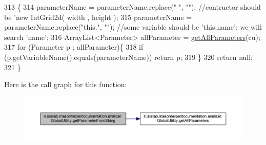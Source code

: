 \begin{DoxyCode}
313                                                                                             \{
314         parameterName = parameterName.replace(\textcolor{stringliteral}{" "}, \textcolor{stringliteral}{""}); \textcolor{comment}{//contructor should be 'new IntGrid2d( width  ,
       height  );}
315         parameterName = parameterName.replace(\textcolor{stringliteral}{"this."}, \textcolor{stringliteral}{""}); \textcolor{comment}{//some variable should be 'this.name'; we will
       search 'name';}
316         ArrayList<Parameter> allParameter = \hyperlink{classit_1_1isislab_1_1masonhelperdocumentation_1_1analizer_1_1_global_utility_a7bfa58de5b5e760b043e34e98aa222ee}{getAllParameters}(cu);
317         \textcolor{keywordflow}{for} (Parameter p : allParameter)\{
318             \textcolor{keywordflow}{if} (p.getVariableName().equals(parameterName))  \textcolor{keywordflow}{return} p;
319         \}       
320         \textcolor{keywordflow}{return} null;
321     \}
\end{DoxyCode}


Here is the call graph for this function\-:\nopagebreak
\begin{figure}[H]
\begin{center}
\leavevmode
\includegraphics[width=350pt]{classit_1_1isislab_1_1masonhelperdocumentation_1_1analizer_1_1_global_utility_ad7c0b1c480e30f055bb39d24c68902e7_cgraph}
\end{center}
\end{figure}


